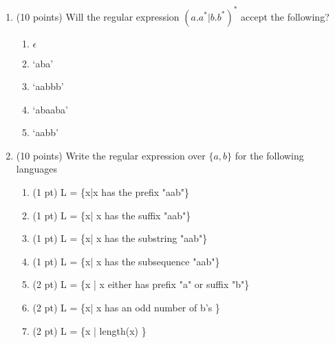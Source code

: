 \documentclass[10pt]{article}
\begin{document}
\begin{enumerate}
\begin{itemize}
\end{itemize} 

\item (10 points) Will the regular expression $(a.a^*|b.b^*)^*$ accept the following?
\begin{enumerate}
    \item $\epsilon$
    \item  `aba'
    \item `aabbb'
    \item `abaaba'
    \item `aabb'
\end{enumerate}

\item (10 points) Write the  regular expression over $\{a,b\}$ for the following languages
\begin{enumerate}
    \item (1 pt) L = \{x|x has the prefix "aab"\}
    \item (1 pt) L = \{x| x has the suffix "aab"\}
    \item (1 pt) L = \{x| x has the substring "aab"\}
    \item (1 pt) L = \{x| x has the subsequence "aab"\}
    \item (2 pt) L = \{x | x either has prefix "a" or suffix "b"\}
    \item (2 pt) L = \{x| x has an odd number of b's \}
    \item (2 pt) L = \{x | length(x) \}
\end{enumerate}
\end{enumerate}
\end{document}
